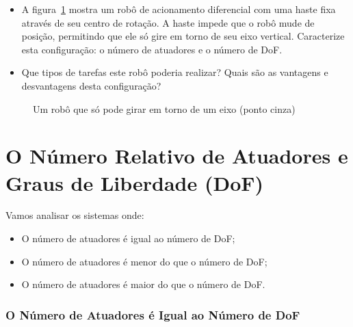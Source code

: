 \begin{framed}
\begin{itemize}
\item A figura~\ref{fig.rot-dof} mostra um robô de acionamento diferencial com uma haste fixa através de seu centro de rotação. A haste impede que o robô mude de posição, permitindo que ele só gire em torno de seu eixo vertical. Caracterize esta configuração: o número de atuadores e o número de DoF.
\item Que tipos de tarefas este robô poderia realizar? Quais são as vantagens e desvantagens desta configuração?
\end{itemize}
\end{framed}

\begin{figure}
\begin{center}
\end{center}
\caption{Um robô que só pode girar em torno de um eixo (ponto cinza)}\label{fig.rot-dof}
\end{figure}

\section{O Número Relativo de Atuadores e Graus de Liberdade (DoF)}\label{s.num-actuators}

Vamos analisar os sistemas onde:
\begin{itemize}
\item O número de atuadores é igual ao número de DoF;
\item O número de atuadores é menor do que o número de DoF;
\item O número de atuadores é maior do que o número de DoF.
\end{itemize}

\subsubsection*{O Número de Atuadores é Igual ao Número de DoF}

